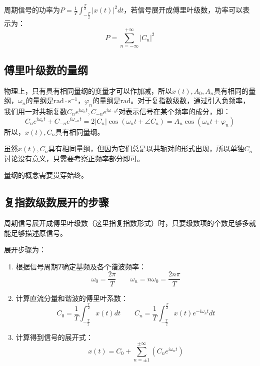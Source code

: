 \begin{theorem}[Parseval定理]
周期信号的功率为$P=\frac{1}{T}\int_{-\frac{T}{2}}^{\frac{T}{2}}{\left| x\left( t \right) \right|^2dt}$，若信号展开成傅里叶级数，功率可以表示为：
\[
P=\sum_{n=-\infty}^{+\infty}{\left| C_n \right|^2}
\]
\end{theorem}

\subsection{傅里叶级数的量纲}

物理上，只有具有相同量纲的变量才可以作加减，所以$x\left( t \right) ,A_0,A_n$具有相同的量纲，$\omega _n$的量纲是$\mathrm{rad}\cdot \mathrm{s}^{-1}$，$\varphi _n$的量纲是$\mathrm{rad}$。对于复指数级数，通过引入负频率，我们用一对共轭复数$C_ne^{i\omega _nt},C_{-n}e^{i\omega _{-n}t}$对表示信号在某个频率的成分，即：
\[
C_ne^{i\omega _nt}+C_{-n}e^{i\omega _{-n}t}=2\left| C_n \right|\cos \left( \omega _nt+\angle C_n \right) =A_n\cos \left( \omega _nt+\varphi _n \right)
\]
所以，$x\left( t \right) ,C_n$具有相同量纲。

虽然$x\left( t \right) ,C_n$具有相同量纲，但因为它们总是以共轭对的形式出现，所以单独$C_n$讨论没有意义，只需要考察正频率部分即可。

\begin{tcolorbox}
量纲的概念需要贯穿始终。
\end{tcolorbox}

\subsection{复指数级数展开的步骤}

周期信号展开成傅里叶级数（这里指复指数形式）时，只要级数项的个数足够多就能足够描述原信号。

展开步骤为：
\begin{enumerate}
    \item 根据信号周期$T$确定基频及各个谐波频率：
    \[
    \omega _0=\frac{2\pi}{T} \qquad \omega _n=n\omega _0=\frac{2n\pi}{T}
    \]
    \item 计算直流分量和谐波的傅里叶系数：
    \[
    C_0=\frac{1}{T}\int_{-\frac{T}{2}}^{\frac{T}{2}}{x\left( t \right) dt} \qquad C_n=\frac{1}{T}\int_{-\frac{T}{2}}^{\frac{T}{2}}{x\left( t \right) e^{-i\omega _nt}dt}
    \]
    \item 计算得到信号的展开式：
    \[
    x\left( t \right) =C_0+\sum_{n=\pm 1}^{\pm \infty}{\left( C_ne^{i\omega _nt} \right)}
    \]
\end{enumerate}

